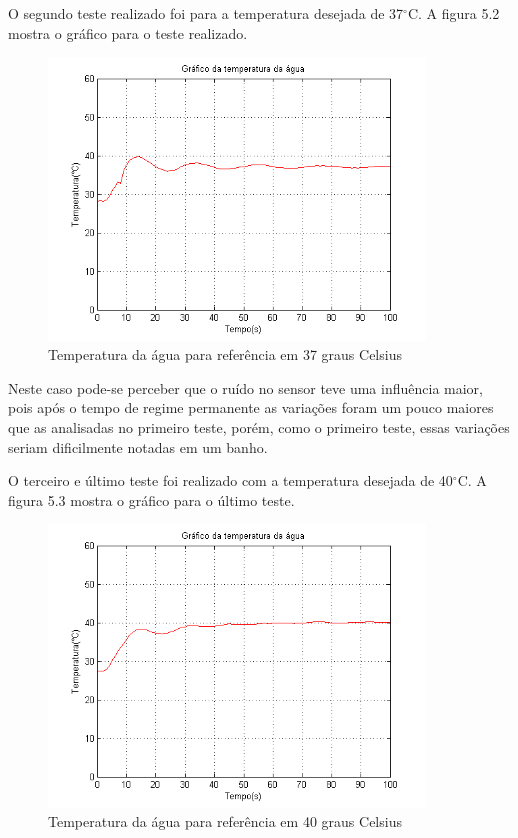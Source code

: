 O segundo teste realizado foi para a temperatura desejada de 37$^{\circ}$C. A figura 5.2 mostra o gráfico para o teste realizado.
\begin{figure}[H]
\center

\includegraphics[width=10cm]{imagens/grafico_37graus.png}

\label{Temperatura da água para referência em 37 graus Celsius}

\caption{Temperatura da água para referência em 37 graus Celsius}
\end{figure}

\noindent Neste caso pode-se perceber que o ruído no sensor teve uma influência maior, pois após o tempo de regime permanente as variações foram um pouco maiores que as analisadas no primeiro teste, porém, como o primeiro teste, essas variações seriam dificilmente notadas em um banho.

O terceiro e último teste foi realizado com a temperatura desejada de 40$^{\circ}$C. A figura 5.3 mostra o gráfico para o último teste.
\begin{figure}[H]
\center

\includegraphics[width=10cm]{imagens/grafico_40graus.png}

\label{Temperatura da água para referência em 40 graus Celsius}

\caption{Temperatura da água para referência em 40 graus Celsius}
\end{figure}

